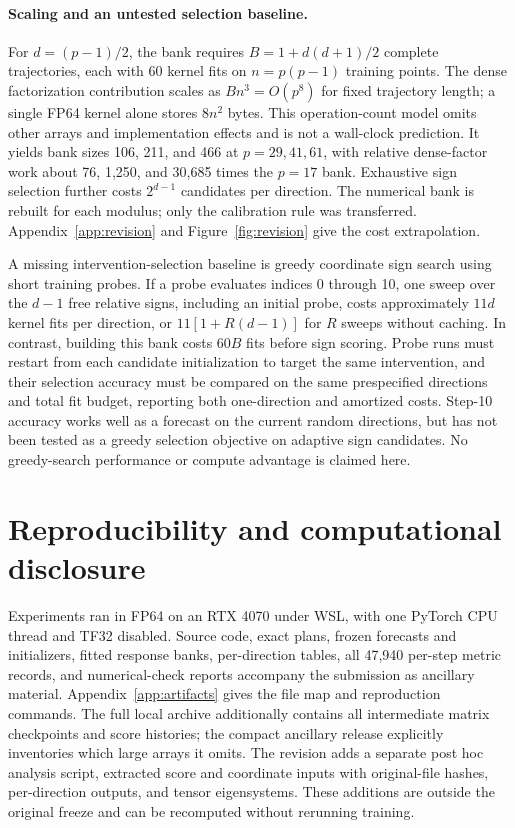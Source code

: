\documentclass[11pt]{article}
\begin{document}
\paragraph{Scaling and an untested selection baseline.}
For $d=(p-1)/2$, the bank requires $B=1+d(d+1)/2$ complete trajectories, each with 60 kernel fits on $n=p(p-1)$ training points. The dense factorization contribution scales as $B n^3=O(p^8)$ for fixed trajectory length; a single FP64 kernel alone stores $8n^2$ bytes. This operation-count model omits other arrays and implementation effects and is not a wall-clock prediction. It yields bank sizes 106, 211, and 466 at $p=29,41,61$, with relative dense-factor work about 76, 1,250, and 30,685 times the $p=17$ bank. Exhaustive sign selection further costs $2^{d-1}$ candidates per direction. The numerical bank is rebuilt for each modulus; only the calibration rule was transferred. Appendix~\ref{app:revision} and Figure~\ref{fig:revision} give the cost extrapolation.

A missing intervention-selection baseline is greedy coordinate sign search using short training probes. If a probe evaluates indices 0 through 10, one sweep over the $d-1$ free relative signs, including an initial probe, costs approximately $11d$ kernel fits per direction, or $11[1+R(d-1)]$ for $R$ sweeps without caching. In contrast, building this bank costs $60B$ fits before sign scoring. Probe runs must restart from each candidate initialization to target the same intervention, and their selection accuracy must be compared on the same prespecified directions and total fit budget, reporting both one-direction and amortized costs. Step-10 accuracy works well as a forecast on the current random directions, but has not been tested as a greedy selection objective on adaptive sign candidates. No greedy-search performance or compute advantage is claimed here.

\section{Reproducibility and computational disclosure}\label{sec:repro}
Experiments ran in FP64 on an RTX 4070 under WSL, with one PyTorch CPU thread and TF32 disabled. Source code, exact plans, frozen forecasts and initializers, fitted response banks, per-direction tables, all 47,940 per-step metric records, and numerical-check reports accompany the submission as ancillary material. Appendix~\ref{app:artifacts} gives the file map and reproduction commands. The full local archive additionally contains all intermediate matrix checkpoints and score histories; the compact ancillary release explicitly inventories which large arrays it omits. The revision adds a separate post hoc analysis script, extracted score and coordinate inputs with original-file hashes, per-direction outputs, and tensor eigensystems. These additions are outside the original freeze and can be recomputed without rerunning training.
\end{document}
